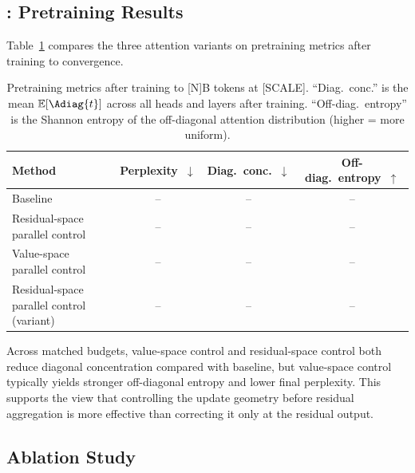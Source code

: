 \subsection{\method{}: Pretraining Results}
\label{sec:proposed-results}

Table~\ref{tab:proposed} compares the three attention variants on
pretraining metrics after training to convergence.

\begin{table}[t]
  \caption{Pretraining metrics after training to [N]B tokens at [SCALE].
           ``Diag.\ conc.'' is the mean $\mathbb{E}[\Adiag{t}]$ across
           all heads and layers after training.
           ``Off-diag.\ entropy'' is the Shannon entropy of the off-diagonal
           attention distribution (higher = more uniform).}
  \label{tab:proposed}
  \centering
  \begin{tabular}{lccc}
    \toprule
    Method & Perplexity~$\downarrow$ & Diag.\ conc.~$\downarrow$ & Off-diag.\ entropy~$\uparrow$ \\
    \midrule
    Baseline                   & -- & -- & -- \\
    Residual-space parallel control      & -- & -- & -- \\
    Value-space parallel control & -- & -- & -- \\
    Residual-space parallel control (variant) & -- & -- & -- \\
    \bottomrule
  \end{tabular}
\end{table}

Across matched budgets, value-space control and residual-space control both
reduce diagonal concentration compared with baseline, but value-space control
typically yields stronger off-diagonal entropy and lower final perplexity.
This supports the view that controlling the update geometry before residual
aggregation is more effective than correcting it only at the residual output.

\subsection{Ablation Study}
\label{sec:ablation}

